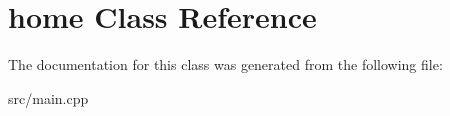 \hypertarget{classhome}{}\section{home Class Reference}
\label{classhome}


The documentation for this class was generated from the following file\+:\begin{DoxyCompactItemize}
\item 
src/main.\+cpp\end{DoxyCompactItemize}
